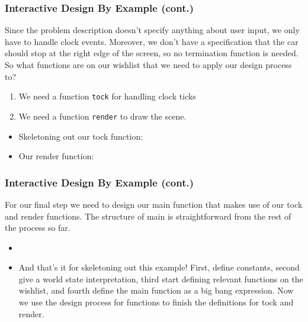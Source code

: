 \documentclass{beamer}
\begin{document}


\begin{frame}
  \frametitle{Interactive Design By Example (cont.)}
  Since the problem description doesn't specify anything about user
  input, we only have to handle clock events. Moreover, we don't have a specification that the car should stop at the right edge of the screen, so no termination function is needed. So what functions are on our wishlist that we need to apply our design process to?
  \begin{enumerate}
  \item<2-> We need a function \texttt{tock} for handling clock ticks
  \item<3-> We need a function \texttt{render} to draw the scene.
  \end{enumerate}
  \begin{itemize}
  \item<4-> Skeletoning out our tock function:
    \tock
  \item<5-> Our render function:
    \render
  \end{itemize}
\end{frame}


\begin{frame}
  \frametitle{Interactive Design By Example (cont.)}
  For our final step we need to design our main function that makes
  use of our tock and render functions. The structure of main is
  straightforward from the rest of the process so far. 
  \begin{itemize}
  \item<2-> \mainProg
  \item<3-> And that's it for skeletoning out this example! First, define constants,
    second give a world state interpretation, third start defining relevant
    functions on the wishlist, and fourth define the main function as a
    big bang expression. Now we use the design process for functions to finish
    the definitions for tock and render.
  \end{itemize}
\end{frame}
\end{document}
